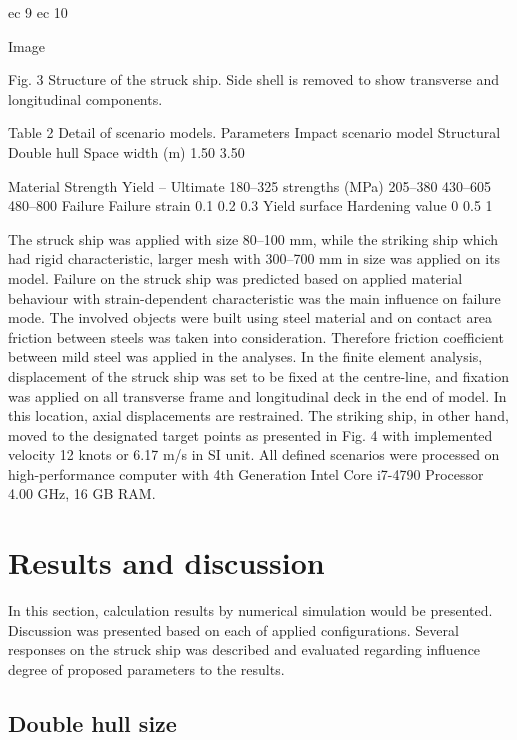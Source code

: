 \documentclass[10pt,journal]{IEEEtran}
\begin{document}
ec 9
ec 10 

Image

Fig. 3 Structure of the struck ship. Side shell is removed to show transverse and longitudinal components. 

Table 2 Detail of scenario models. 
Parameters  Impact scenario model  
Structural  Double hull  Space width (m)  1.50  
3.50  

Material  Strength  Yield – Ultimate  180–325  
strengths (MPa)  205–380  
430–605  
480–800  
Failure  Failure strain  0.1  
0.2  
0.3  
Yield surface  Hardening value  0  
0.5  
1  


The struck ship was applied with size 80–100 mm, while the striking ship which had rigid characteristic, larger mesh with 300–700 mm in size was applied on its model. 
Failure on the struck ship was predicted based on applied material behaviour with strain-dependent characteristic was the main influence on failure mode. 
The involved objects were built using steel material and on contact area friction between steels was taken into consideration. Therefore friction coefficient between mild steel was applied in the analyses. 
In the finite element analysis, displacement of the struck ship was set to be fixed at the centre-line, and fixation was applied on all transverse frame and longitudinal deck in the end of model. 
In this location, axial displacements are restrained. The striking ship, in other hand, moved to the designated target points as presented in Fig. 4 with implemented velocity 12 knots or 6.17 m/s in SI unit. 
All defined scenarios were processed on high-performance computer with 4th Generation Intel Core i7-4790 Processor 4.00 GHz, 16 GB RAM. 

\section{Results and discussion }

In this section, calculation results by numerical simulation would be presented. Discussion was presented based on each of applied configurations. 
Several responses on the struck ship was described and evaluated regarding influence degree of proposed parameters to the results. 

\subsection{Double hull size}
\end{document}
